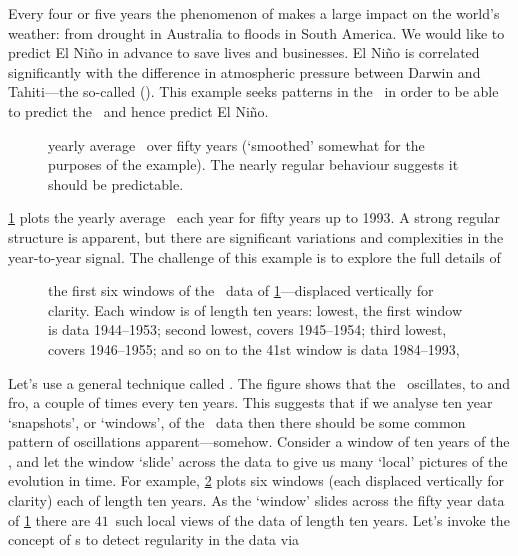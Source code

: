 \begin{example} \label{eg:orthbapp}
Every four or five years the phenomenon of  makes a large impact on the world's weather: from drought in Australia to floods in South America.
We would like to predict El Ni\~no in advance to save lives and businesses.
El Ni\~no is correlated significantly with the difference in atmospheric pressure between Darwin and Tahiti---the so-called  (\soi).
This example seeks patterns in the \soi\ in order to be able to predict the \soi\ and hence predict El Ni\~no.

\begin{figure}
\centering

\caption{yearly average \soi\ over fifty years (`smoothed' somewhat for the purposes of the example).  
The nearly regular behaviour suggests it should be predictable.}
\label{fig:soiRoundData}
\end{figure}

\cref{fig:soiRoundData} plots the yearly average \soi\ each year for fifty years up to 1993.
A strong regular structure is apparent, but there are significant variations and complexities in the year-to-year signal.
The challenge of this example is to explore the full details of 

\begin{figure}
\centering

\caption{the first six windows of the \soi\ data of \cref{fig:soiRoundData}---displaced vertically for clarity. 
Each window is of length ten years: 
lowest, the first window is data 1944--1953;
second lowest, covers 1945--1954;
third lowest, covers 1946--1955; 
and so on to the 41st window is data 1984--1993, }
\label{fig:soiRoundWind}
\end{figure}

Let's use a general technique called .
The figure shows that the \soi\ oscillates, to and fro, a couple of times every ten years.
This suggests that if we analyse ten year `snapshots', or `windows', of the \soi\ data then there should be some common pattern of oscillations apparent---somehow.
Consider a window of ten years of the \soi, and let the window `slide' across the data to give us many `local' pictures of the evolution in time.
For example, \cref{fig:soiRoundWind} plots six windows (each displaced vertically for clarity) each of length ten years.
As the `window' slides across the fifty year data of \cref{fig:soiRoundData} there are \(41\)~such local views of the data of length ten years.
Let's invoke the concept of s to detect regularity in the data via 


\end{example}
